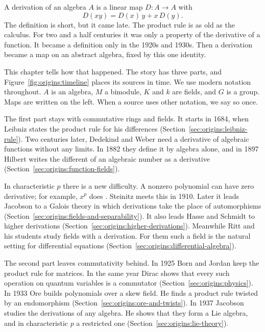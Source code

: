 
A derivation of an algebra $A$ is a linear map $D\colon A \to A$ with
\[
  D(xy) = D(x)\,y + x\,D(y).
\]
The definition is short, but it came late. The product rule is as old as the
calculus. For two and a half centuries it was only a property of the
derivative of a function. It became a definition only in the 1920s and 1930s.
Then a derivation became a map on an abstract algebra, fixed by this one
identity.

This chapter tells how that happened. The story has three parts, and
Figure~\ref{fig:origins:timeline} places its sources in time. We use modern
notation throughout. $A$ is an algebra, $M$ a bimodule, $K$ and $k$ are fields,
and $G$ is a group. Maps are written on the left. When a source uses other
notation, we say so once.


The first part stays with commutative rings and fields. It starts in 1684,
when Leibniz states the product rule for his differences
(Section~\ref{sec:origins:leibniz-rule}). Two centuries later, Dedekind and
Weber need a derivative of algebraic functions without any limits. In 1882
they define it by algebra alone, and in 1897 Hilbert writes the different of
an algebraic number as a derivative (Section~\ref{sec:origins:function-fields}).

In characteristic $p$ there is a new difficulty. A nonzero polynomial can
have zero derivative; for example, $x^p$ does
\cite[\S 9, p.~213]{Steinitz1910}. Steinitz
meets this in 1910. Later it leads Jacobson to a Galois theory in which
derivations take the place of automorphisms
(Section~\ref{sec:origins:fields-and-separability}). It also leads Hasse and
Schmidt to higher derivations (Section~\ref{sec:origins:higher-derivations}).
Meanwhile Ritt and his students study fields with a derivation. For them such
a field is the natural setting for differential equations
(Section~\ref{sec:origins:differential-algebra}).

The second part leaves commutativity behind. In 1925 Born and Jordan keep the
product rule for matrices. In the same year Dirac shows that every such
operation on quantum variables is a commutator
(Section~\ref{sec:origins:physics}). In 1933 Ore builds polynomials over a
skew field. He finds a product rule twisted by an endomorphism
(Section~\ref{sec:origins:ore-and-twists}). In 1937 Jacobson studies the
derivations of any algebra. He shows that they form a Lie algebra, and in
characteristic $p$ a restricted one (Section~\ref{sec:origins:lie-theory}).

